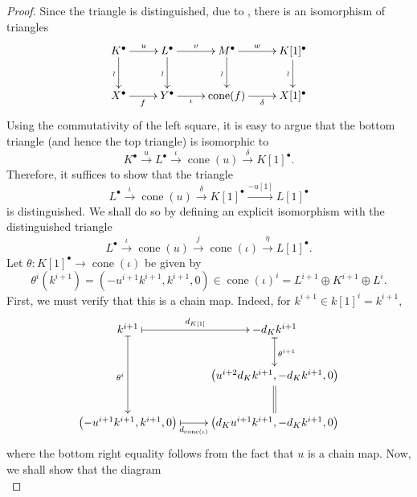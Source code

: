 \documentclass[11pt]{article}
\theoremstyle{thmstyle}
\theoremstyle{defstyle}
\newcommand{\cone}{\operatorname{cone}}
\begin{document}
\begin{proof}
	Since the triangle is distinguished, due to , there is an isomorphism of triangles 
	\begin{equation*}
		\xymatrix {
			K^\bullet\ar[r]^-u\ar[d]_\wr & L^\bullet\ar[r]^-v\ar[d]_\wr & M^\bullet\ar[r]^-w\ar[d]_\wr & K[1]^\bullet\ar[d]_\wr\\
			X^\bullet\ar[r]_f & Y^\bullet\ar[r]_-\iota & \cone(f)\ar[r]_-\delta & X[1]^\bullet
		}
	\end{equation*}
	Using the commutativity of the left square, it is easy to argue that the bottom triangle (and hence the top triangle) is isomorphic to 
	\begin{equation*}
		K^\bullet\xrightarrow{u} L^\bullet\xrightarrow{\iota}\cone(u)\xrightarrow{\delta} K[1]^\bullet.
	\end{equation*}
	Therefore, it suffices to show that the triangle 
	\begin{equation*}
		L^\bullet\xrightarrow{\iota}\cone(u)\xrightarrow{\delta} K[1]^\bullet\xrightarrow{-u[1]} L[1]^\bullet
	\end{equation*}
	is distinguished. We shall do so by defining an explicit isomorphism with the distinguished triangle 
	\begin{equation*}
		L^\bullet\xrightarrow{\iota}\cone(u)\xrightarrow{j}\cone(\iota)\xrightarrow{\eta} L[1]^\bullet.
	\end{equation*}
	Let $\theta\colon K[1]^\bullet\to\cone(\iota)$ be given by 
	\begin{equation*}
		\theta^i\left(k^{i + 1}\right) = \left(-u^{i + 1}k^{i + 1}, k^{i + 1}, 0\right)\in\cone(\iota)^i = L^{i + 1}\oplus K^{i + 1}\oplus L^i.
	\end{equation*}
	First, we must verify that this is a chain map. Indeed, for $k^{i + 1}\in k[1]^i = k^{i + 1}$, 
	\begin{equation*}
		\xymatrix {
			k^{i + 1}\ar@{|->}[r]^-{d_{K[1]}}\ar@{|->}[dd]_{\theta^i} & -d_K k^{i + 1}\ar@{|->}[d]^{\theta^{i + 1}}\\
			& \left(u^{i + 2}d_K k^{i + 1}, -d_K k^{i + 1}, 0\right)\ar@{=}[d]\\
			\left(-u^{i + 1}k^{i + 1}, k^{i + 1}, 0\right)\ar@{|->}[r]_-{d_{\cone(\iota)}} & \left(d_Ku^{i + 1}k^{i + 1}, -d_K k^{i + 1}, 0\right)
		}
	\end{equation*}
	where the bottom right equality follows from the fact that $u$ is a chain map. Now, we shall show that the diagram 
	\begin{equation*}

\end{equation*}
\end{proof}
\end{document}
